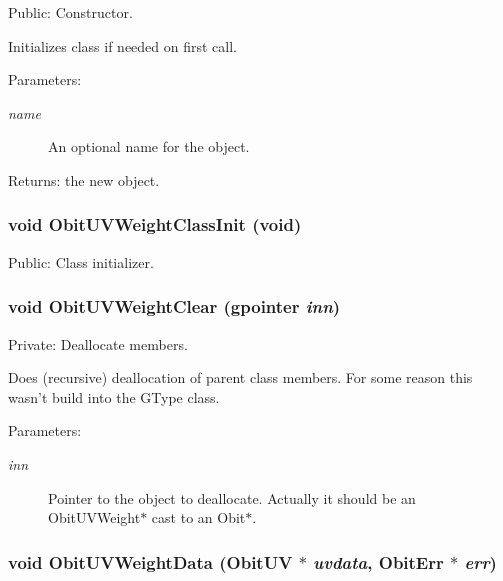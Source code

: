 Public: Constructor. 

Initializes class if needed on first call. \begin{Desc}
\item[Parameters:]
\begin{description}
\item[{\em name}]An optional name for the object. \end{description}
\end{Desc}
\begin{Desc}
\item[Returns:]the new object. \end{Desc}
\subsubsection{\setlength{\rightskip}{0pt plus 5cm}void Obit\-UVWeight\-Class\-Init (void)}\label{ObitUVWeight_8c_a22}


Public: Class initializer. 

\subsubsection{\setlength{\rightskip}{0pt plus 5cm}void Obit\-UVWeight\-Clear (gpointer {\em inn})}\label{ObitUVWeight_8c_a9}


Private: Deallocate members. 

Does (recursive) deallocation of parent class members. For some reason this wasn't build into the GType class. \begin{Desc}
\item[Parameters:]
\begin{description}
\item[{\em inn}]Pointer to the object to deallocate. Actually it should be an Obit\-UVWeight$\ast$ cast to an Obit$\ast$. \end{description}
\end{Desc}
\subsubsection{\setlength{\rightskip}{0pt plus 5cm}void Obit\-UVWeight\-Data ({\bf Obit\-UV} $\ast$ {\em uvdata}, {\bf Obit\-Err} $\ast$ {\em err})}\label{ObitUVWeight_8c_a21}


